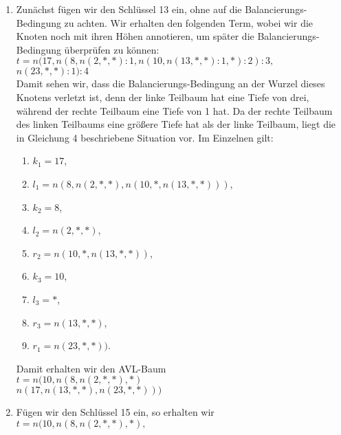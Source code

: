 \documentclass{article}
\begin{document}
\begin{enumerate}
\item Zun\"achst f\"ugen wir den Schl\"ussel 13 ein, ohne auf die Balancierungs-Bedingung zu
      achten.  Wir erhalten den folgenden Term, wobei wir die Knoten noch mit ihren H\"ohen
      annotieren, um sp\"ater die Balancierungs-Bedingung \"uberpr\"ufen zu k\"onnen:
      \\[0.2cm]
      \hspace*{1.3cm}
      $t = n(17, n(8, n(2, *, *):1,
                    n(10, n(13, *, *):1, *):2):3,$ \\
      \hspace*{2.75cm} $
                n(23,*,*):1):4$
      \\[0.2cm]
      Damit sehen wir, dass die Balancierungs-Bedingung an der Wurzel dieses
      Knotens verletzt ist, denn der linke Teilbaum hat eine Tiefe von drei, w\"ahrend der
      rechte Teilbaum eine Tiefe von 1 hat.  Da der rechte Teilbaum des linken Teilbaums
      eine gr\"o{\ss}ere Tiefe hat als der linke Teilbaum, liegt die in Gleichung 4 beschriebene
      Situation vor.  Im Einzelnen gilt:
      \begin{enumerate}
      \item $k_1 = 17$,
      \item $l_1 = n(8, n(2, *, *), n(10, *, n(13, *, *)))$,
      \item $k_2 = 8$,
      \item $l_2 = n(2, *, *)$,
      \item $r_2 = n(10, *, n(13, *, *))$,
      \item $k_3 = 10$,
      \item $l_3 = *$,
      \item $r_3 = n(13, *, *)$,
      \item $r_1 = n(23,*,*))$.
      \end{enumerate}
      Damit erhalten wir den AVL-Baum
      \\[0.2cm]
      \hspace*{1.3cm}
      $t = n(10, 
                   n(8, n(2, *, *), *)$ \\
      \hspace*{2.75cm} $
                n(17, n(13, *, *), n(23, *,*)))$
\item F\"ugen wir den Schl\"ussel 15 ein, so erhalten wir 
      \\[0.2cm]
      \hspace*{1.3cm}
      $t = n(10, 
                n(8, n(2, *, *), *),$ \\

\end{enumerate}
\end{document}
